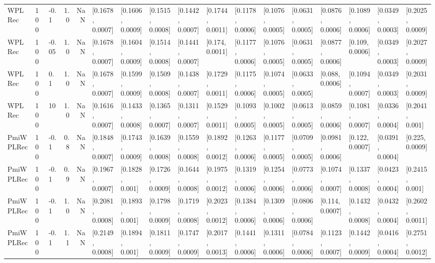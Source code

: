 \begin{tabular}{lllrrllllllllllll}
    WPLRec &  100 &  -0.1 &   1.0 &   NaN &  [0.1678, 0.0007] &  [0.1606, 0.0009] &  [0.1515, 0.0008] &  [0.1442, 0.0007] &  [0.1744, 0.0011] &  [0.1178, 0.0006] &  [0.1076, 0.0005] &  [0.0631, 0.0005] &  [0.0876, 0.0006] &  [0.1089, 0.0006] &  [0.0349, 0.0003] &  [0.2025, 0.0009] \\
    WPLRec &  100 & -0.05 &   1.0 &   NaN &  [0.1678, 0.0007] &  [0.1604, 0.0009] &  [0.1514, 0.0008] &  [0.1441, 0.0007] &   [0.174, 0.0011] &  [0.1177, 0.0006] &  [0.1076, 0.0005] &  [0.0631, 0.0005] &  [0.0877, 0.0006] &   [0.109, 0.0006] &  [0.0349, 0.0003] &  [0.2027, 0.0009] \\
    WPLRec &  100 &   0.1 &   1.0 &   NaN &  [0.1678, 0.0007] &  [0.1599, 0.0009] &  [0.1509, 0.0008] &  [0.1438, 0.0007] &  [0.1729, 0.0011] &  [0.1175, 0.0006] &  [0.1074, 0.0005] &  [0.0633, 0.0005] &   [0.088, 0.0006] &  [0.1094, 0.0007] &  [0.0349, 0.0003] &  [0.2031, 0.0009] \\
    WPLRec &  100 &    10 &   1.0 &   NaN &  [0.1616, 0.0007] &  [0.1433, 0.0008] &  [0.1365, 0.0007] &  [0.1311, 0.0007] &  [0.1529, 0.0011] &  [0.1093, 0.0005] &  [0.1002, 0.0005] &  [0.0613, 0.0005] &  [0.0859, 0.0006] &  [0.1081, 0.0007] &  [0.0336, 0.0004] &   [0.2041, 0.001] \\
 PmiWPLRec &  100 &  -0.1 &   0.8 &   NaN &  [0.1848, 0.0007] &  [0.1743, 0.0009] &  [0.1639, 0.0008] &  [0.1559, 0.0008] &  [0.1892, 0.0012] &  [0.1263, 0.0006] &  [0.1177, 0.0005] &  [0.0709, 0.0005] &  [0.0981, 0.0006] &   [0.122, 0.0007] &  [0.0391, 0.0004] &   [0.225, 0.0009] \\
 PmiWPLRec &  100 &  -0.1 &   0.9 &   NaN &  [0.1967, 0.0007] &   [0.1828, 0.001] &  [0.1726, 0.0009] &  [0.1644, 0.0008] &  [0.1975, 0.0012] &  [0.1319, 0.0006] &  [0.1254, 0.0006] &  [0.0773, 0.0006] &  [0.1074, 0.0007] &  [0.1337, 0.0008] &  [0.0423, 0.0004] &   [0.2415, 0.001] \\
 PmiWPLRec &  100 &  -0.1 &   1.0 &   NaN &  [0.2081, 0.0008] &   [0.1893, 0.001] &  [0.1798, 0.0009] &  [0.1719, 0.0008] &  [0.2023, 0.0012] &  [0.1384, 0.0006] &  [0.1309, 0.0006] &  [0.0806, 0.0006] &   [0.114, 0.0007] &  [0.1432, 0.0008] &  [0.0432, 0.0004] &  [0.2602, 0.0011] \\
 PmiWPLRec &  100 &  -0.1 &   1.1 &   NaN &  [0.2149, 0.0008] &   [0.1894, 0.001] &  [0.1811, 0.0009] &  [0.1747, 0.0009] &  [0.2017, 0.0013] &  [0.1441, 0.0006] &  [0.1311, 0.0006] &  [0.0784, 0.0006] &  [0.1123, 0.0007] &  [0.1442, 0.0009] &  [0.0416, 0.0004] &  [0.2751, 0.0012] \\

\end{tabular}
